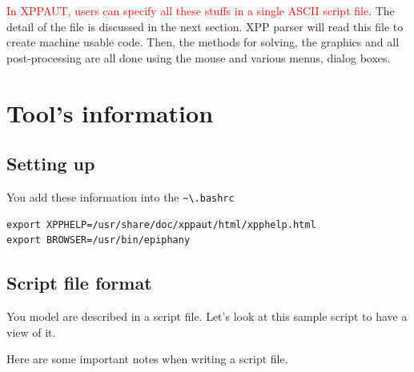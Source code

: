 \textcolor{red}{In XPPAUT, users can specify all these stuffs in a single
  ASCII script file}.
The detail of the file is discussed in the next section.  XPP parser
will read this file to create machine usable code. Then, the methods
for solving, the graphics and all post-processing are all done using
the mouse and various menus, dialog boxes.

\section{Tool's information}
\label{sec:tools-information}

\subsection{Setting up}
\label{sec:setting-up}

You add these information into the \verb!~\.bashrc!
\begin{verbatim}
export XPPHELP=/usr/share/doc/xppaut/html/xpphelp.html
export BROWSER=/usr/bin/epiphany
\end{verbatim}


\subsection{Script file format}
\label{sec:file-format}

You model are described in a script file. Let's look at this sample
script to have a view of it.



Here are some important notes when writing a script file.


